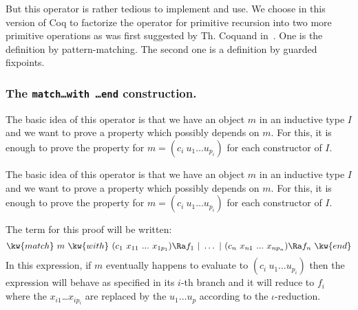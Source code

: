 But this operator is rather tedious to implement and use. We choose in
this version of Coq to factorize the operator for primitive recursion
into two more primitive operations as was first suggested by Th. Coquand
in~\cite{Coq92}.  One is the definition by pattern-matching. The second one is a definition by guarded fixpoints. 

\subsubsection[The {\tt match\ldots with \ldots end} construction.]{The {\tt match\ldots with \ldots end} construction.\label{Caseexpr}
}

The basic idea of this operator is that we have an object
$m$ in an inductive type $I$ and we want to prove a property
which possibly depends on $m$. For this, it is enough to prove the
property for $m = (c_i~u_1\ldots  u_{p_i})$ for each constructor of $I$.


The basic idea of this operator is that we have an object
$m$ in an inductive type $I$ and we want to prove a property
which possibly depends on $m$. For this, it is enough to prove the
property for $m = (c_i~u_1\ldots  u_{p_i})$ for each constructor of $I$.

The \Coq{} term for this proof will be written:
\[\kw{match}~m~\kw{with}~ (c_1~x_{11}~...~x_{1p_1}) \Ra f_1 ~|~\ldots~|~
  (c_n~x_{n1}~...~x_{np_n}) \Ra f_n~ \kw{end}\]
In this expression, if
$m$ eventually happens to evaluate to $(c_i~u_1\ldots u_{p_i})$ then
the expression will behave as specified in its $i$-th branch and
it will reduce to $f_i$ where the $x_{i1}$\ldots $x_{ip_i}$ are replaced
by the $u_1\ldots u_p$ according to the $\iota$-reduction.

